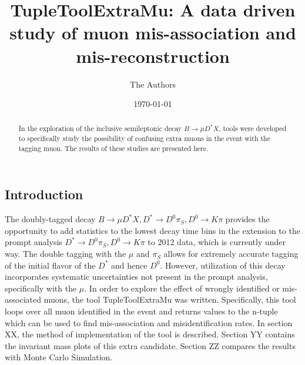 \documentclass[11pt]{article}%
\begin{document}
\title{TupleToolExtraMu: A data driven study of muon mis-association and mis-reconstruction}%
\author{The Authors}%
\date{\today}
\maketitle
\begin{flushleft}

\begin{abstract}
	In the exploration of the inclusive semileptonic decay $B\to\mu D^*X$, tools were developed to specifically study the possibility of confusing extra muons in the event with the tagging muon. The results of these studies are presented here.
\end{abstract}
\setrunninglinenumbers
\section{Introduction}
\begin{linenumbers}
\hspace{10mm}The doubly-tagged decay $B\to\mu D^* X,D^*\to D^0\pi_S,D^0\to K \pi$ provides the opportunity to add statistics to the lowest decay time bins in the extension to the prompt analysis $D^*\to D^0\pi_S,D^0\to K \pi$ to 2012 data, which is currently under way. The double tagging with the $\mu$ and $\pi_S$ allows for extremely accurate tagging of the initial flavor of the $D^*$ and hence $D^0$. However, utilization of this decay incorporates systematic uncertainties not present in the prompt analysis, specifically with the $\mu$. In order to explore the effect of wrongly identified or mis-associated muons, the tool TupleToolExtraMu was written. Specifically, this tool loops over all muon identified in the event and returns values to the n-tuple which can be used to find mis-association and misidentification rates. In section XX, the method of implementation of the tool is described. Section YY contains the invariant mass plots of this extra candidate. Section ZZ compares the results with Monte Carlo Simulation.


\end{linenumbers}
\end{flushleft}
\end{document}
